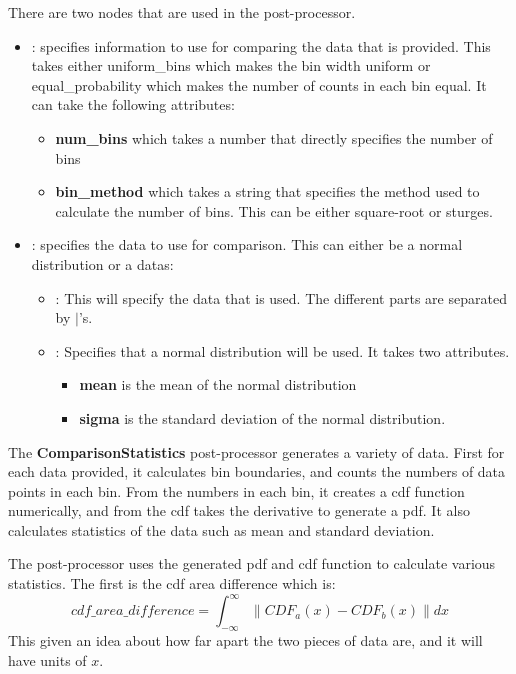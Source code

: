 There are two nodes that are used in the post-processor.

\begin{itemize}
\item {}: specifies information to use for comparing the
  data that is provided.  This takes either uniform\_bins which makes
  the bin width uniform or equal\_probability which makes the number
  of counts in each bin equal.  It can take the following attributes:
  \begin{itemize}
  \item \textbf{num\_bins} which takes a number that directly
    specifies the number of bins
  \item \textbf{bin\_method} which takes a string that specifies the
    method used to calculate the number of bins.  This can be either
    square-root or sturges.
  \end{itemize}
\item {}: specifies the data to use for comparison.
  This can either be a normal distribution or a datas:
  \begin{itemize}
  \item {}: This will specify the data that is used.  The
    different parts are separated by $|$'s.
  \item {}: Specifies that a normal distribution will
    be used. It takes two attributes.
    \begin{itemize}
    \item \textbf{mean} is the mean of the normal distribution
    \item \textbf{sigma} is the standard deviation of the normal
      distribution.
    \end{itemize}
  \end{itemize}
\end{itemize}

The \textbf{ComparisonStatistics} post-processor generates a variety
of data.  First for each data provided, it calculates bin boundaries,
and counts the numbers of data points in each bin.  From the numbers
in each bin, it creates a cdf function numerically, and from the cdf
takes the derivative to generate a pdf.  It also calculates statistics
of the data such as mean and standard deviation.

The post-processor uses the generated pdf and cdf function to
calculate various statistics.  The first is the cdf area difference which is:
\begin{equation}
  cdf\_area\_difference = \int_{-\infty}^{\infty}{\|CDF_a(x)-CDF_b(x)\|dx}
\end{equation}
This given an idea about how far apart the two pieces of data are, and
it will have units of $x$.

